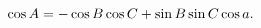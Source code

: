 \[\mathop{\cos\/}\nolimits A=-\mathop{\cos\/}\nolimits B\mathop{\cos\/}\nolimits
C%
+\mathop{\sin\/}\nolimits B\mathop{\sin\/}\nolimits C\mathop{\cos\/}\nolimits a.\]
